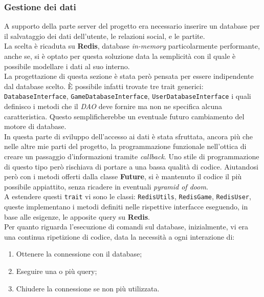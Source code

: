         \subsubsection{Gestione dei dati}
          A supporto della parte server del progetto era necessario inserire un database per il salvataggio dei dati dell'utente, le relazioni social, e le partite.
          \\
          La scelta è ricaduta su \textbf{Redis}, database \textit{in-memory} particolarmente performante, anche se, si è optato per questa soluzione data la semplicità con il quale è possibile modellare i dati al suo interno.
          \\
          La progettazione di questa sezione è stata però pensata per essere indipendente dal database scelto. È possibile infatti trovate tre trait generici: \texttt{DatabaseInterface}, \texttt{GameDatabaseInterface}, \texttt{UserDatabaseInterface} i quali definisco i metodi che il \textit{DAO} deve fornire ma non ne specifica alcuna caratteristica. Questo semplificherebbe un eventuale futuro cambiamento del motore di database. \\
          In questa parte di sviluppo dell'accesso ai dati è stata sfruttata, ancora più che nelle altre mie parti del progetto, la programmazione funzionale nell'ottica di creare un passaggio d'informazioni tramite \textit{callback}. Uno stile di programmazione di questo tipo però rischiava di portare a una bassa qualità di codice. Aiutandosi però con i metodi offerti dalla classe \textbf{Future}, si è mantenuto il codice il più possibile appiattito, senza ricadere in eventuali \textit{pyramid of doom}.
          \\
          A estendere questi \texttt{trait} vi sono le classi: \texttt{RedisUtils}, \texttt{RedisGame}, \texttt{RedisUser}, queste implementano i metodi definiti nelle rispettive interfacce eseguendo, in base alle esigenze, le apposite query su \textbf{Redis}.
          \\
          Per quanto riguarda l'esecuzione di comandi sul database, inizialmente, vi era una continua ripetizione di codice, data la necessità a ogni interazione di:

          \begin{enumerate}
           \item Ottenere la connessione con il database;
           \item Eseguire una o più query;
           \item Chiudere la connessione se non più utilizzata.
          \end{enumerate}

